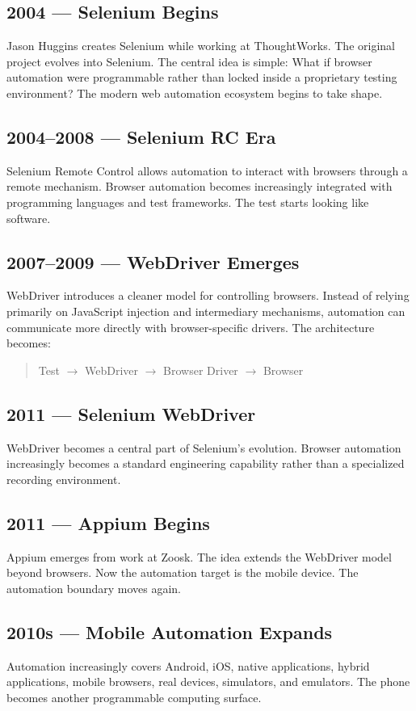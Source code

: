 \documentclass[11pt,twoside]{book}
\begin{document}
\subsection*{2004 — Selenium Begins}
Jason Huggins creates Selenium while working at ThoughtWorks.
The original project evolves into Selenium.
The central idea is simple: What if browser automation were programmable rather than locked inside a proprietary testing environment?
The modern web automation ecosystem begins to take shape.

\subsection*{2004–2008 — Selenium RC Era}
Selenium Remote Control allows automation to interact with browsers through a remote mechanism.
Browser automation becomes increasingly integrated with programming languages and test frameworks.
The test starts looking like software.

\subsection*{2007–2009 — WebDriver Emerges}
WebDriver introduces a cleaner model for controlling browsers.
Instead of relying primarily on JavaScript injection and intermediary mechanisms, automation can communicate more directly with browser-specific drivers.
The architecture becomes:
\begin{quote}
\centering
Test $\rightarrow$ WebDriver $\rightarrow$ Browser Driver $\rightarrow$ Browser
\end{quote}

\subsection*{2011 — Selenium WebDriver}
WebDriver becomes a central part of Selenium's evolution.
Browser automation increasingly becomes a standard engineering capability rather than a specialized recording environment.

\subsection*{2011 — Appium Begins}
Appium emerges from work at Zoosk.
The idea extends the WebDriver model beyond browsers.
Now the automation target is the mobile device.
The automation boundary moves again.

\subsection*{2010s — Mobile Automation Expands}
Automation increasingly covers Android, iOS, native applications, hybrid applications, mobile browsers, real devices, simulators, and emulators.
The phone becomes another programmable computing surface.
\end{document}
